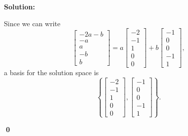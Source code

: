 \documentclass{article}
\newenvironment{solution}
{
	\ignorespaces
	\textbf{Solution:}
}
{
	\ignorespacesafterend
	\begin{flushright}
	{\bfseries \qed}
	\end{flushright}
}
\begin{document}
\begin{solution}
Since we can write \[\begin{bmatrix} -2a-b \\ -a \\ a \\ -b \\ b \end{bmatrix} = a \begin{bmatrix} -2 \\ -1 \\ 1 \\ 0 \\ 0 \end{bmatrix} + b \begin{bmatrix} -1 \\ 0 \\ 0 \\ -1 \\ 1 \end{bmatrix}, \]
a basis for the solution space is
\[ \left \{ \begin{bmatrix} -2 \\ -1 \\ 1 \\ 0 \\ 0 \end{bmatrix} , \begin{bmatrix} -1 \\ 0 \\ 0 \\ -1 \\ 1 \end{bmatrix} \right\}.\]
\end{solution}
\end{document}
